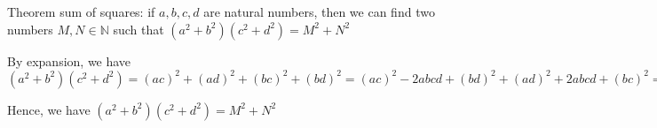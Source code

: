 
Theorem sum of squares: if $a, b, c, d$ are natural numbers, then we can find two numbers $M, N \in \mathbb{N}$ such that $(a^2+b^2)(c^2+d^2) = M^2 + N^2$

By expansion, we have $(a^2+b^2)(c^2+d^2) = (ac)^2 + (ad)^2 + (bc)^2 + (bd)^2 = (ac)^2 - 2abcd + (bd)^2 + (ad)^2 + 2abcd + (bc)^2 = (ac-bd)^2+(ad+bc)^2$

Hence, we have $(a^2+b^2)(c^2+d^2) = M^2 + N^2$